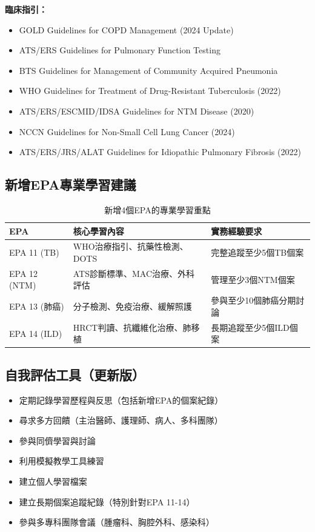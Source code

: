 \documentclass[12pt,a4paper]{article}
\begin{document}
\textbf{臨床指引：}
\begin{itemize}
    \item GOLD Guidelines for COPD Management (2024 Update)
    \item ATS/ERS Guidelines for Pulmonary Function Testing
    \item BTS Guidelines for Management of Community Acquired Pneumonia
    \item \textcolor{emergency_red}{WHO Guidelines for Treatment of Drug-Resistant Tuberculosis (2022)}
    \item \textcolor{emergency_red}{ATS/ERS/ESCMID/IDSA Guidelines for NTM Disease (2020)}
    \item \textcolor{emergency_red}{NCCN Guidelines for Non-Small Cell Lung Cancer (2024)}
    \item \textcolor{emergency_red}{ATS/ERS/JRS/ALAT Guidelines for Idiopathic Pulmonary Fibrosis (2022)}
\end{itemize}

\subsection{新增EPA專業學習建議}
\begin{table}[h]
    \centering
    \caption{新增4個EPA的專業學習重點}
    \begin{tabular}{p{2cm} p{6cm} p{6cm}}
        \toprule
        \textbf{EPA} & \textbf{核心學習內容} & \textbf{實務經驗要求} \\
        \midrule
        EPA 11 (TB) & WHO治療指引、抗藥性檢測、DOTS & 完整追蹤至少5個TB個案 \\
        EPA 12 (NTM) & ATS診斷標準、MAC治療、外科評估 & 管理至少3個NTM個案 \\
        EPA 13 (肺癌) & 分子檢測、免疫治療、緩解照護 & 參與至少10個肺癌分期討論 \\
        EPA 14 (ILD) & HRCT判讀、抗纖維化治療、肺移植 & 長期追蹤至少5個ILD個案 \\
        \bottomrule
    \end{tabular}
\end{table}

\subsection{自我評估工具（更新版）}
\begin{itemize}[nosep]
    \item 定期記錄學習歷程與反思（包括新增EPA的個案紀錄）
    \item 尋求多方回饋（主治醫師、護理師、病人、多科團隊）
    \item 參與同儕學習與討論
    \item 利用模擬教學工具練習
    \item 建立個人學習檔案
    \item \textcolor{emergency_red}{建立長期個案追蹤紀錄（特別針對EPA 11-14）}
    \item \textcolor{emergency_red}{參與多專科團隊會議（腫瘤科、胸腔外科、感染科）}
\end{itemize}
\end{document}
